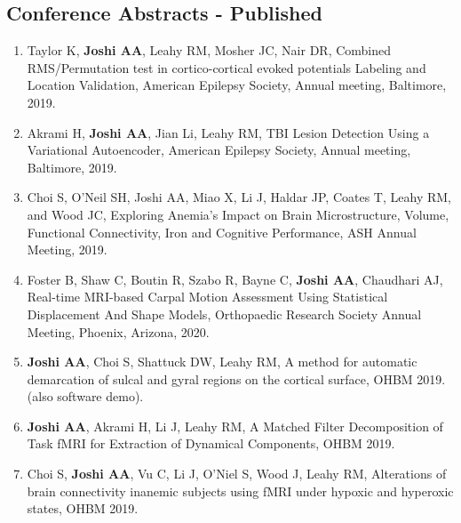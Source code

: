 \documentclass[overlapped,line,letterpaper]{res}
\begin{document}
\begin{resume}

\subsection{Conference Abstracts - Published}
\begin{enumerate}

    \item Taylor K, \textbf{Joshi AA}, Leahy RM, Mosher JC, Nair DR, Combined RMS/Permutation test in cortico-cortical evoked potentials Labeling and Location Validation, American Epilepsy Society, Annual meeting, Baltimore, 2019.

    \item Akrami H, \textbf{Joshi AA}, Jian Li, Leahy RM, {TBI Lesion Detection Using a Variational Autoencoder}, American Epilepsy Society, Annual meeting, Baltimore, 2019.

    \item Choi S, O'Neil SH, Joshi AA, Miao X, Li J, Haldar JP, Coates T, Leahy RM, and Wood JC, {Exploring Anemia’s Impact on Brain Microstructure, Volume, Functional Connectivity, Iron and Cognitive Performance}, ASH Annual Meeting, 2019.

    \item Foster B, Shaw C, Boutin R, Szabo R, Bayne C, \textbf{Joshi AA}, Chaudhari AJ, {Real-time MRI-based Carpal Motion Assessment Using Statistical Displacement And Shape Models}, Orthopaedic Research Society Annual Meeting, Phoenix, Arizona, 2020.

    \item \textbf{Joshi AA}, Choi S, Shattuck DW, Leahy RM, {A method for automatic demarcation of sulcal and gyral regions on the cortical surface}, OHBM 2019. (also software demo).

    \item \textbf{Joshi AA}, Akrami H, Li J, Leahy RM, {A Matched Filter Decomposition of Task fMRI for Extraction of Dynamical Components}, OHBM 2019.

    \item Choi S, \textbf{Joshi AA}, Vu C, Li J, O'Niel S, Wood J, Leahy RM, {Alterations of brain connectivity inanemic subjects using fMRI under hypoxic and hyperoxic states}, OHBM 2019.


\end{enumerate}
\end{resume}
\end{document}
